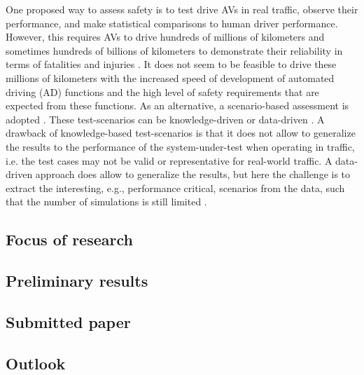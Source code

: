 One proposed way to assess safety is to test drive AVs in real traffic, observe their performance, and make statistical comparisons to human driver performance. However, this requires AVs to drive hundreds of millions of kilometers and sometimes hundreds of billions of kilometers to demonstrate their reliability in terms of fatalities and injuries \cite{kalra2016driving}. It does not seem to be feasible to drive these millions of kilometers with the increased speed of development of automated driving (AD) functions and the high level of safety requirements that are expected from these functions. As an alternative, a scenario-based assessment is adopted \cite{putz2017pegasus, stellet2015taxonomy, deGelder2017assessment, ploeg2018cetran, elrofai2018scenario}. 
These test-scenarios can be knowledge-driven or data-driven \cite{stellet2015taxonomy}. A drawback of knowledge-based test-scenarios is that it does not allow to generalize the results to the performance of the system-under-test when operating in traffic, i.e. the test cases may not be valid or representative for real-world traffic. A data-driven approach does allow to
generalize the results, but here the challenge is to extract the interesting, e.g., performance critical, scenarios from the data, such that the number of simulations is still limited \cite{deGelder2017assessment}.

\subsection{Focus of research}
\label{sec:focus}



\subsection{Preliminary results}
\label{sec:results}




\subsection{Submitted paper}
\label{sec:paper}


\subsection{Outlook}
\label{sec:outlook}
